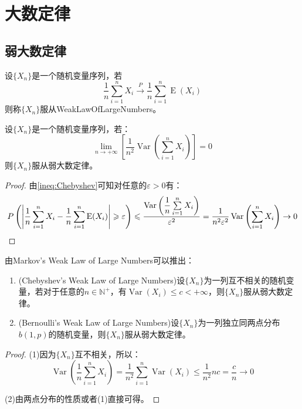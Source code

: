 \section{大数定律}

\subsection{弱大数定律}
\begin{definition}
	设$\{X_n\}$是一个随机变量序列，若
	\begin{equation*}
		\frac{1}{n}\sum_{i=1}^{n}X_i\overset{P}{\longrightarrow}\frac{1}{n}\sum_{i=1}^{n}\operatorname{E}(X_i)
	\end{equation*}
	则称$\{X_n\}$服从\gls{WeakLawOfLargeNumbers}。
\end{definition}
\begin{theorem}
	设$\{X_n\}$是一个随机变量序列，若：
	\begin{equation*}
		\lim_{n\to+\infty}\left[\frac{1}{n^2}\operatorname{Var}\left(\sum_{i=1}^{n}X_i\right)\right]=0
	\end{equation*}
	则$\{X_n\}$服从弱大数定律。
\end{theorem}
\begin{proof}
	由\cref{ineq:Chebyshev}可知对任意的$\varepsilon>0$有：
	\begin{equation*}
		P\left(\left|\frac{1}{n}\sum_{i=1}^{n}X_i-\frac{1}{n}\sum_{i=1}^{n}\operatorname{E}(X_i)\right|\geqslant\varepsilon\right)\leqslant\frac{\operatorname{Var}\left(\dfrac{1}{n}\sum\limits_{i=1}^{n}X_i\right)}{\varepsilon^2}=\frac{1}{n^2\varepsilon^2}\operatorname{Var}\left(\sum_{i=1}^{n}X_i\right)\to0\qedhere
	\end{equation*}
\end{proof}
\begin{corollary}
	由Markov's Weak Law of Large Numbers可以推出：
	\begin{enumerate}
		\item (Chebyshev's Weak Law of Large Numbers)设$\{X_n\}$为一列互不相关的随机变量，若对于任意的$n\in\mathbb{N}^+$，有$\operatorname{Var}(X_i)\leqslant c<+\infty$，则$\{X_n\}$服从弱大数定律。
		\item (Bernoulli's Weak Law of Large Numbers)设$\{X_n\}$为一列独立同两点分布$b(1,p)$的随机变量，则$\{X_n\}$服从弱大数定律。
	\end{enumerate}
\end{corollary}
\begin{proof}
	(1)因为$\{X_n\}$互不相关，所以：
	\begin{equation*}
		\operatorname{Var}\left(\frac{1}{n}\sum_{i=1}^{n}X_i\right)=\frac{1}{n^2}\sum_{i=1}^{n}\operatorname{Var}(X_i)\leqslant\frac{1}{n^2}nc=\frac{c}{n}\to0
	\end{equation*}\par
	(2)由两点分布的性质或者(1)直接可得。
\end{proof}
